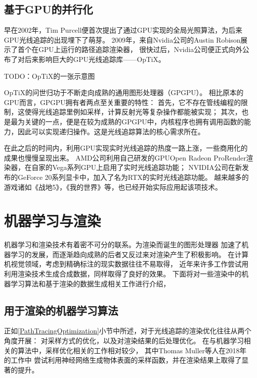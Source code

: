 \subsection{基于GPU的并行化} 

早在2002年，Tim Purcell便首次提出了通过GPU实现的全局光照算法，为后来GPU光线追踪的出现埋下了萌芽。
2009年，来自Nvidia公司的Austin Robison展示了首个在GPU上运行的路径追踪渲染器，
很快过后，Nvidia公司便正式向外公布了对后来影响巨大的GPU光线追踪库——OpTiX\cite{Optix}。

TODO：OpTiX的一张示意图

OpTiX的问世归功于不断走向成熟的通用图形处理器（GPGPU）。
相比原本的GPU而言，GPGPU拥有者两点至关重要的特性：
首先，它不存在管线编程的限制，这使得光线追踪里例如采样，计算反射光等复杂操作都能被实现；
其次，也是最为关键的一点，便是在较为成熟的GPGPU中，内核程序也拥有调用函数的能力，因此可以实现递归操作。这是光线追踪算法的核心需求所在。

在此之后的时间内，利用GPU实现实时光线追踪的热度一路上涨，一些商用化的成果也慢慢呈现出来。
AMD公司利用自己研发的GPUOpen Radeon ProRender渲染器，在自家的Vega系列GPU上启用了实时光线追踪功能\cite{Vega}；
NVIDIA公司在新发布的GeForce 20系列显卡中，加入了名为RTX的实时光线追踪功能\cite{RTXOn}。
越来越多的游戏诸如《战地5》，《我的世界》等，也已经开始实际应用起该项技术。

\section{机器学习与渲染}

机器学习和渲染技术有着密不可分的联系。为渲染而诞生的图形处理器
加速了机器学习的发展，而逐渐趋向成熟的后者又反过来对渲染产生了积极影响。
在计算机视觉领域，考虑到精确标注的现实数据往往不易取得，
近年来许多工作尝试用利用渲染技术生成合成数据，同样取得了良好的效果。
下面将对一些渲染中的机器学习算法和基于渲染的数据生成相关工作进行介绍，

\subsection{用于渲染的机器学习算法}

正如\ref{PathTracingOptimization}小节中所述，对于光线追踪的渲染优化往往从两个角度开展：
对采样方式的优化，以及对渲染结果的后处理优化。
在与机器学习相关的算法中，采样优化相关的工作相对较少，
其中Thomas Muller等人在2018年的工作\cite{neuralImportanceSampling}中
尝试利用神经网络生成物体表面的采样函数，并在渲染结果上取得了显著的提升。

